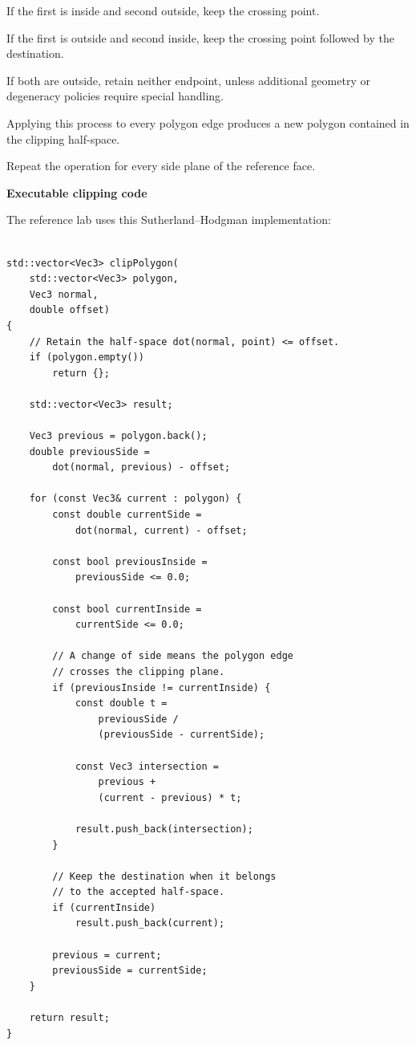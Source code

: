 If the first is inside and second outside, keep the crossing point.

If the first is outside and second inside, keep the crossing point followed by the destination.

If both are outside, retain neither endpoint, unless additional geometry or degeneracy policies require special handling.

Applying this process to every polygon edge produces a new polygon contained in the clipping half-space.

Repeat the operation for every side plane of the reference face.

\textbf{Executable clipping code}

The reference lab uses this Sutherland--Hodgman implementation:

\begin{verbatim}

std::vector<Vec3> clipPolygon(
    std::vector<Vec3> polygon,
    Vec3 normal,
    double offset)
{
    // Retain the half-space dot(normal, point) <= offset.
    if (polygon.empty())
        return {};

    std::vector<Vec3> result;

    Vec3 previous = polygon.back();
    double previousSide =
        dot(normal, previous) - offset;

    for (const Vec3& current : polygon) {
        const double currentSide =
            dot(normal, current) - offset;

        const bool previousInside =
            previousSide <= 0.0;

        const bool currentInside =
            currentSide <= 0.0;

        // A change of side means the polygon edge
        // crosses the clipping plane.
        if (previousInside != currentInside) {
            const double t =
                previousSide /
                (previousSide - currentSide);

            const Vec3 intersection =
                previous +
                (current - previous) * t;

            result.push_back(intersection);
        }

        // Keep the destination when it belongs
        // to the accepted half-space.
        if (currentInside)
            result.push_back(current);

        previous = current;
        previousSide = currentSide;
    }

    return result;
}
\end{verbatim}

